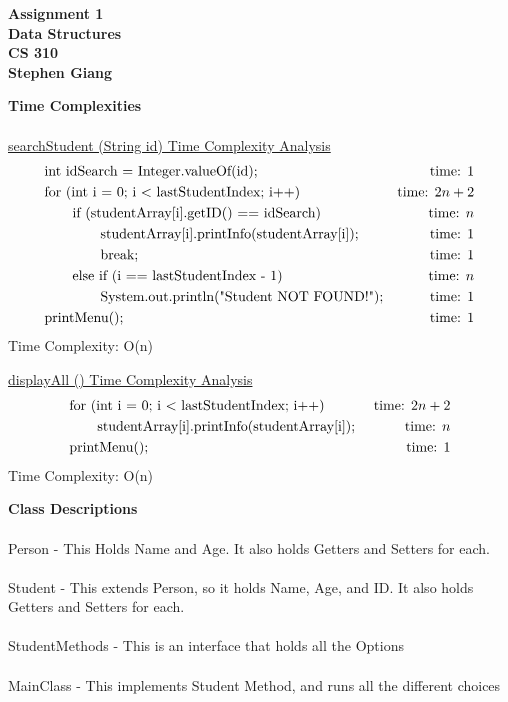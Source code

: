 \documentclass[12pt]{article}
\begin{document}
	
	\begin{center}
		\textbf{Assignment 1} \\
		\textbf{Data Structures} \\
		\textbf{CS 310} \\
		\textbf{Stephen Giang} \\
	\end{center}

\vspace{\baselineskip}
\noindent \textbf{Time Complexities} \\\\
\underline{searchStudent (String id) Time Complexity Analysis}
	\begin{align}   
		&\text{int idSearch = Integer.valueOf(id);} 		& \text{time: } 1 \\
		&\text{for (int i = 0; i $<$ lastStudentIndex; i++)} 	& \text{time: } 2n+2   \\
		&\text{\qquad if (studentArray[i].getID() == idSearch)} 	& \text{time: } n  \\
		&\text{\qquad \qquad studentArray[i].printInfo(studentArray[i]);} & \text{time: } 1\\
		&\text{\qquad \qquad break;} 										& \text{time: } 1 \\
		&\text{\qquad else if (i == lastStudentIndex - 1)}  		& \text{time: } n\\
		&\text{\qquad \qquad System.out.println("Student NOT FOUND!");}  	& \text{time: } 1 \\
		&\text{printMenu();} 								& \text{time: } 1 
	\end{align}
Time Complexity: O(n)

\vspace{\baselineskip}
\vspace{\baselineskip}
\noindent \underline{displayAll () Time Complexity Analysis}
	\begin{align}
	    &\text{for (int i = 0; i $<$ lastStudentIndex; i++) } 		& \text{time: } 2n+2 \\
		&\text{\qquad studentArray[i].printInfo(studentArray[i]); }		& \text{time: } n \\
		&\text{printMenu(); }										& \text{time: } 1 
	\end{align}
Time Complexity: O(n)

\vspace{\baselineskip}
\vspace{\baselineskip}
\noindent \textbf{Class Descriptions} \\\\
Person - This Holds Name and Age.  It also holds Getters and Setters for each. \\\\
Student - This extends Person, so it holds Name, Age, and ID. It also holds Getters and Setters for each. \\\\
StudentMethods - This is an interface that holds all the Options \\\\
MainClass - This implements Student Method, and runs all the different choices
	
\end{document}
